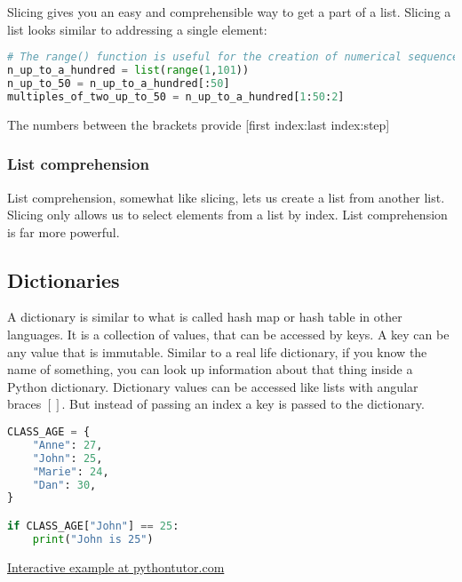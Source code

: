\documentclass{article}
\begin{document}
Slicing gives you an easy and comprehensible way to get a part of a list.
Slicing a list looks similar to addressing a single element:

\begin{lstlisting}[language=Python]
# The range() function is useful for the creation of numerical sequences.
n_up_to_a_hundred = list(range(1,101))
n_up_to_50 = n_up_to_a_hundred[:50]
multiples_of_two_up_to_50 = n_up_to_a_hundred[1:50:2]
\end{lstlisting}
The numbers between the brackets provide [first index:last index:step]


\subsubsection{List comprehension}

List comprehension, somewhat like slicing, lets us create a list from another list.
Slicing only allows us to select elements from a list by index.
List comprehension is far more powerful.

\subsection{Dictionaries}\label{dictionary}

A dictionary is similar to what is called hash map or hash table in other languages.
It is a collection of values, that can be accessed by keys.
A key can be any value that is immutable.
Similar to a real life dictionary, if you know the name of something, you can look up
information about that thing inside a Python dictionary.
Dictionary values can be accessed like lists with angular braces $[]$.
But instead of passing an index a key is passed to the dictionary.

\begin{lstlisting}[language=Python]
CLASS_AGE = {
    "Anne": 27,
    "John": 25,
    "Marie": 24,
    "Dan": 30,
}

if CLASS_AGE["John"] == 25:
    print("John is 25")
\end{lstlisting}

\href{http://pythontutor.com/visualize.html\#code=CLASS\_AGE\%20\%3D\%20\%7B\%0A\%20\%20\%20\%20\%22Anne\%22\%3A\%2027,\%0A\%20\%20\%20\%20\%22John\%22\%3A\%2025,\%0A\%20\%20\%20\%20\%22Marie\%22\%3A\%2024,\%0A\%20\%20\%20\%20\%22Dan\%22\%3A\%2030,\%0A\%7D\%0A\%0A\%23\%20This\%20is\%20True\%0Aif\%20CLASS\_AGE\%5B\%22John\%22\%5D\%20\%3D\%3D\%2025\%3A\%0A\%20\%20\%20\%20print\%28\%22John\%20is\%2025\%22\%29\%0A\%20\%20\%20\%20\%0Afor\%20key,\%20value\%20in\%20CLASS\_AGE.items\%28\%29\%3A\%0A\%20\%20\%20\%20print\%28f\%22\%7Bkey\%7D\%20is\%20\%7Bvalue\%7D\%20years\%20old.\%22\%29\&cumulative=false\&curInstr=15\&heapPrimitives=nevernest\&mode=display\&origin=opt-frontend.js\&py=3\&rawInputLstJSON=\%5B\%5D\&textReferences=false}
{Interactive example at pythontutor.com}
\end{document}
